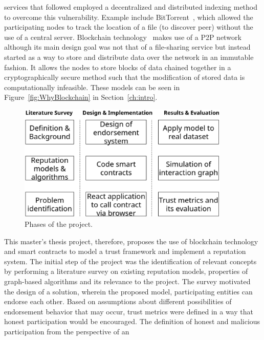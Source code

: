 services that followed employed a decentralized and distributed indexing method
to overcome this vulnerability. Example include
BitTorrent~\cite{cohen2003incentives,cohen2008bittorrent}, which allowed the
participating nodes to track the location of a file (to discover peer) without
the use of a central server. Blockchain technology~\cite{pilkington201611}
makes use of a P2P network although its main design goal was not that of a
file-sharing service but instead started as a way to store and distribute data
over the network in an immutable fashion. It allows the nodes to store blocks
of data chained together in a cryptographically secure method such that the
modification of stored data is computationally infeasible. These models can be
seen in Figure~\ref{fig:WhyBlockchain} in Section~\ref{ch:intro}.  \par
\begin{figure}[H]
	\begin{center}
		\includegraphics[width=0.9\textwidth]{Images/workflow.eps}
		\caption{Phases of the project.}
		\label{fig:thesisSteps}
	\end{center}
\end{figure}
\vspace{-8mm}
This master’s thesis project, therefore, proposes the use of blockchain
technology and smart contracts to model a trust framework and implement a
reputation system. The initial step of the project was the identification of
relevant concepts by performing a literature survey on existing reputation
models, properties of graph-based algorithms and its relevance to the project.
The survey motivated the design of a solution, wherein the proposed model,
participating entities can endorse each other. Based on assumptions about
different possibilities of endorsement behavior that may occur, trust metrics
were defined in a way that honest participation would be encouraged. The
definition of honest and malicious participation from the perspective of an
